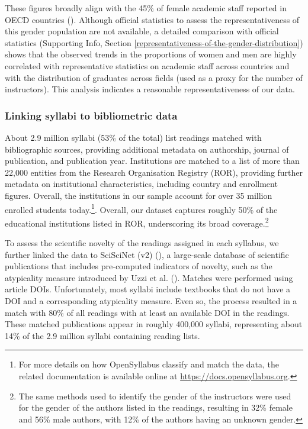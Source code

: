 \documentclass[
  11pt,
]{article}
\begin{document}
These figures broadly align with the 45\% of female academic staff reported in OECD countries (). Although official statistics to assess the representativeness of this gender population are not available, a detailed comparison with official statistics (Supporting Info, Section \ref{representativeness-of-the-gender-distribution}) shows that the observed trends in the proportions of women and men are highly correlated with representative statistics on academic staff across countries and with the distribution of graduates across fields (used as a proxy for the number of instructors). This analysis indicates a reasonable representativeness of our data.

\subsubsection{Linking syllabi to bibliometric data}\label{linking-syllabi-to-bibliometric-data}

About 2.9 million syllabi (53\% of the total) list readings matched with bibliographic sources, providing additional metadata on authorship, journal of publication, and publication year. Institutions are matched to a list of more than 22,000 entities from the Research Organisation Registry (ROR), providing further metadata on institutional characteristics, including country and enrollment figures. Overall, the institutions in our sample account for over 35 million enrolled students today.\footnote{
  For more details on how OpenSyllabus classify and match the data, the related documentation is available online at \url{https://docs.opensyllabus.org}.}. Overall, our dataset captures roughly 50\% of the educational institutions listed in ROR, underscoring its broad coverage.\footnote{
  The same methods used to identify the gender of the instructors were used for the gender of the authors listed in the readings, resulting in 32\% female and 56\% male authors, with 12\% of the authors having an unknown gender.}

To assess the scientific novelty of the readings assigned in each syllabus, we further linked the data to SciSciNet (v2) (), a large-scale database of scientific publications that includes pre-computed indicators of novelty, such as the atypicality measure introduced by Uzzi et al. (). Matches were performed using article DOIs. Unfortunately, most syllabi include textbooks that do not have a DOI and a corresponding atypicality measure. Even so, the process resulted in a match with 80\% of all readings with at least an available DOI in the readings. These matched publications appear in roughly 400,000 syllabi, representing about 14\% of the 2.9 million syllabi containing reading lists.
\end{document}
